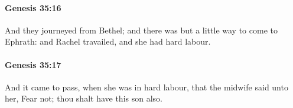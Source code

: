 		\paragraph{Genesis 35:16} %
			\label{GENESIS-35-16}

			And they journeyed from Bethel; and there was but a little way to come to Ephrath: and Rachel travailed, and she had hard labour.


		\paragraph{Genesis 35:17} %
			\label{GENESIS-35-17}

			And it came to pass, when she was in hard labour, that the midwife said unto her, Fear not; thou shalt have this son also.


